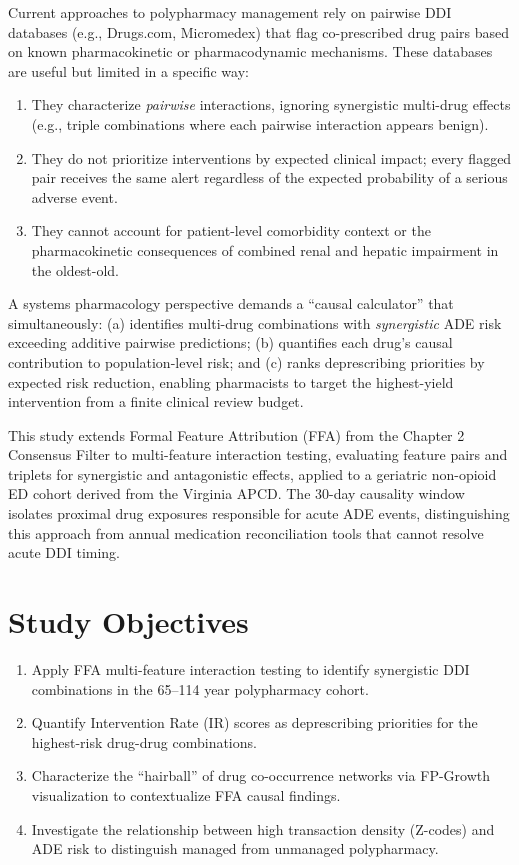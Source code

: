 \documentclass[
  12pt,
]{book}
\providecommand{\tightlist}{%
  \setlength{\itemsep}{0pt}\setlength{\parskip}{0pt}}
\begin{document}
Current approaches to polypharmacy management rely on pairwise DDI
databases (e.g., Drugs.com, Micromedex) that flag co-prescribed drug
pairs based on known pharmacokinetic or pharmacodynamic mechanisms.
These databases are useful but limited in a specific way:

\begin{enumerate}
\def\labelenumi{\arabic{enumi}.}
\tightlist
\item
  They characterize \emph{pairwise} interactions, ignoring synergistic
  multi-drug effects (e.g., triple combinations where each pairwise
  interaction appears benign).
\item
  They do not prioritize interventions by expected clinical impact;
  every flagged pair receives the same alert regardless of the expected
  probability of a serious adverse event.
\item
  They cannot account for patient-level comorbidity context or the
  pharmacokinetic consequences of combined renal and hepatic impairment
  in the oldest-old.
\end{enumerate}

A systems pharmacology perspective demands a ``causal calculator'' that
simultaneously: (a) identifies multi-drug combinations with
\emph{synergistic} ADE risk exceeding additive pairwise predictions; (b)
quantifies each drug's causal contribution to population-level risk; and
(c) ranks deprescribing priorities by expected risk reduction, enabling
pharmacists to target the highest-yield intervention from a finite
clinical review budget.

This study extends Formal Feature Attribution (FFA) from the Chapter 2
Consensus Filter to multi-feature interaction testing, evaluating
feature pairs and triplets for synergistic and antagonistic effects,
applied to a geriatric non-opioid ED cohort derived from the Virginia
APCD. The 30-day causality window isolates proximal drug exposures
responsible for acute ADE events, distinguishing this approach from
annual medication reconciliation tools that cannot resolve acute DDI
timing.

\section{Study Objectives}\label{study-objectives-1}

\begin{enumerate}
\def\labelenumi{\arabic{enumi}.}
\tightlist
\item
  Apply FFA multi-feature interaction testing to identify synergistic
  DDI combinations in the 65--114 year polypharmacy cohort.
\item
  Quantify Intervention Rate (IR) scores as deprescribing priorities for
  the highest-risk drug-drug combinations.
\item
  Characterize the ``hairball'' of drug co-occurrence networks via
  FP-Growth visualization to contextualize FFA causal findings.
\item
  Investigate the relationship between high transaction density
  (Z-codes) and ADE risk to distinguish managed from unmanaged
  polypharmacy.
\end{enumerate}
\end{document}
